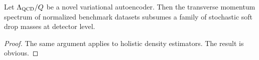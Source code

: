 \begin{lemma}[Interpretability]\label{thm:3}
Let $\Lambda_{\rm QCD}/Q$ be a novel variational autoencoder. Then the
transverse momentum spectrum of normalized benchmark datasets subsumes a
family of stochastic soft drop masses at detector level.
\end{lemma}

\begin{proof}
The same argument applies to holistic density estimators. The result is
obvious.
\end{proof}

